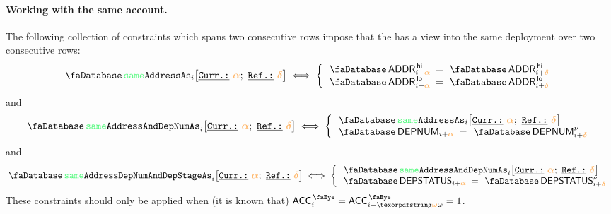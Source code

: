 \paragraph*{Working with the same account.}
The following collection of constraints which spans two consecutive rows impose that the \zkEvm{} has a view into the same deployment over two consecutive rows:
\[
	\accSameAddr  {i}{\reluo}{\reldo}
	\iff
	\left\{ \begin{array}{lcl}
		\accAddress\high_{i + \reluo}	& \!\!\! = \!\!\! & \accAddress\high_{i + \reldo} \\ 
		\accAddress\low _{i + \reluo}	& \!\!\! = \!\!\! & \accAddress\low _{i + \reldo} \\
	\end{array} \right.
\]
and 
\[
	\accSameAddrAndDepNum  {i}{\reluo}{\reldo}
	\iff
	\left\{ \begin{array}{lcl}
		\multicolumn{3}{l}{\accSameAddr  {i}{\reluo}{\reldo}} \\
		\accDepNumber_{i + \reluo} 	& \!\!\! = \!\!\! & \accDepNumber\new_{i + \reldo} \\
	\end{array} \right.
\]
and
\[
	\accSameAddrDepNumAndDepStage  {i}{\reluo}{\reldo}
	\iff
	\left\{ \begin{array}{lcl}
		\multicolumn{3}{l}{\accSameAddrAndDepNum  {i}{\reluo}{\reldo}} \\
		\accDepStatus_{i + \reluo} & \!\!\! = \!\!\! & \accDepStatus\new_{i + \reldo} \\
	\end{array} \right.
\]
\saNote{} These constraints should only be applied when (it is known that) $\peekAccount_{i} = \peekAccount_{i - \relof} = 1$.


